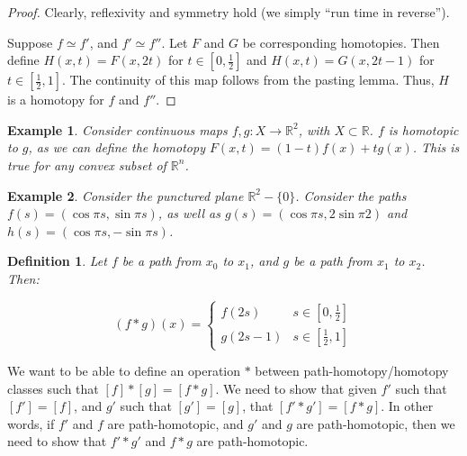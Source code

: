\documentclass[10pt, oneside]{amsart}
\newtheorem{defn}{Definition}
\newtheorem{ex}{Example}
\begin{document}
    \begin{proof}
      Clearly, reflexivity and symmetry hold (we simply ``run time in reverse'').
      \newline

      Suppose $f \simeq f'$, and $f' \simeq f''$. Let $F$ and $G$ be corresponding homotopies. Then define $H(x, t) = F(x, 2t)$ for
      $t \in \left[0, \frac{1}{2}\right]$ and $H(x, t) = G(x, 2t - 1)$ for $t \in \left[\frac{1}{2}, 1\right]$.
      The continuity of this map follows from the pasting lemma. Thus, $H$ is a homotopy for $f$ and $f''$.
    \end{proof}

    \begin{ex}
      Consider continuous maps $f, g : X \rightarrow \mathbb{R}^2$, with $X \subset \mathbb{R}$. $f$ is homotopic to $g$, as we can define the homotopy $F(x, t) = (1 - t) f(x) + t g(x)$. This is true for any convex subset of $\mathbb{R}^n$.
    \end{ex}

    \begin{ex}
      Consider the punctured plane $\mathbb{R}^2 - \{0\}$. Consider the paths $f(s) = (\cos \pi s, \sin \pi s)$, as well as $g(s) = (\cos \pi s, 2 \sin \pi 2)$ and $h(s) = (\cos \pi s, - \sin \pi s)$.
      \end{ex}

    \begin{defn}
      Let $f$ be a path from $x_0$ to $x_1$, and $g$ be a path from $x_1$ to $x_2$. Then:

      $$(f * g)(x) = \begin{cases}
        f(2s) & s \in \left[0, \frac{1}{2} \right] \\
        g(2s - 1) & s \in \left[ \frac{1}{2}, 1 \right]
        \end{cases}$$
    \end{defn}

    We want to be able to define an operation $*$ between path-homotopy/homotopy classes such that $[f] * [g] = [f * g]$. We need
    to show that given $f'$ such that $[f'] = [f]$, and $g'$ such that $[g'] = [g]$, that $[f' * g'] = [f * g]$. In other words,
    if $f'$ and $f$ are path-homotopic, and $g'$ and $g$ are path-homotopic, then we need to show that $f' * g'$ and $f * g$ are
    path-homotopic.
    \newline
\end{document}
